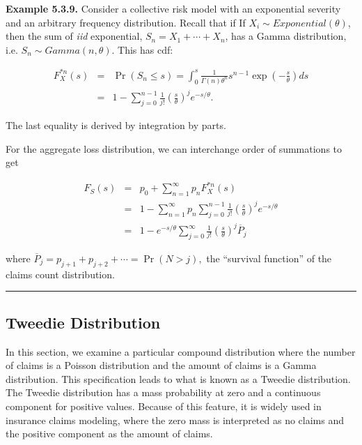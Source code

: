 \documentclass[]{book}
\theoremstyle{definition}
\theoremstyle{definition}
\theoremstyle{definition}
\theoremstyle{remark}
\begin{document}
\textbf{Example 5.3.9.} Consider a collective risk model with an
exponential severity and an arbitrary frequency distribution. Recall
that if If \(X_i\sim Exponential(\theta)\), then the sum of \emph{iid}
exponential, \(S_n=X_1+\cdots+X_n\), has a Gamma distribution, i.e.
\(S_n\sim Gamma(n,\theta)\). This has cdf:

\begin{eqnarray*}
F_{X}^{\ast n}(s) &=& \Pr (S_n \le s) = \int_{0}^{s} \frac{1}{\Gamma(n)\theta^n}s^{n-1}\exp\left(-\frac{s}{\theta}\right) ds\\
&=& 1-\sum_{j=0}^{n-1}\frac{1}{j!}\left( \frac{s}{\theta}\right)^j e^{-s/\theta } .
\end{eqnarray*}

The last equality is derived by integration by parts.

For the aggregate loss distribution, we can interchange order of
summations to get

\begin{eqnarray*}
F_{S}\left(s\right) &=& p_{0}+\sum_{n=1}^{\infty }p_n F_{X}^{\ast n}\left(s\right)\\
&=& 1 - \sum_{n=1}^{\infty }p_n \sum_{j=0}^{n-1}\frac{1}{j!}
\left( \frac{s}{\theta}\right)^j e^{-s/\theta }\\
&=& 1-e^{-s/\theta}\sum_{j=0}^{\infty} \frac{1}{j!}
\left( \frac{s}{\theta} \right)^j \overline{P}_j
\end{eqnarray*}

where \(\overline{P}_j =p_{j+1}+p_{j+2}+\cdots = \Pr (N>j),\) the
``survival function'' of the claims count distribution.

\begin{center}\rule{0.5\linewidth}{\linethickness}\end{center}

\subsection{Tweedie Distribution}\label{tweedie-distribution}

In this section, we examine a particular compound distribution where the
number of claims is a Poisson distribution and the amount of claims is a
Gamma distribution. This specification leads to what is known as a
Tweedie distribution. The Tweedie distribution has a mass probability at
zero and a continuous component for positive values. Because of this
feature, it is widely used in insurance claims modeling, where the zero
mass is interpreted as no claims and the positive component as the
amount of claims.
\end{document}
